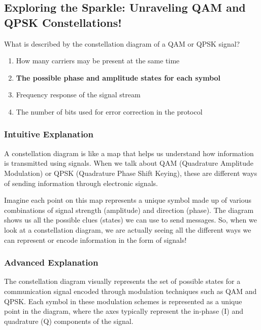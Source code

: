 \subsection{Exploring the Sparkle: Unraveling QAM and QPSK Constellations!}

\begin{tcolorbox}[colback=gray!10, colframe=black, title={\textbf{Question ID: E8C13}}]
What is described by the constellation diagram of a QAM or QPSK signal?
\begin{enumerate}[label=\Alph*.]
    \item How many carriers may be present at the same time
    \item \textbf{The possible phase and amplitude states for each symbol}
    \item Frequency response of the signal stream
    \item The number of bits used for error correction in the protocol
\end{enumerate}
\end{tcolorbox}

\subsubsection{Intuitive Explanation}
A constellation diagram is like a map that helps us understand how information is transmitted using signals. When we talk about QAM (Quadrature Amplitude Modulation) or QPSK (Quadrature Phase Shift Keying), these are different ways of sending information through electronic signals. 

Imagine each point on this map represents a unique symbol made up of various combinations of signal strength (amplitude) and direction (phase). The diagram shows us all the possible clues (states) we can use to send messages. So, when we look at a constellation diagram, we are actually seeing all the different ways we can represent or encode information in the form of signals!

\subsubsection{Advanced Explanation}
The constellation diagram visually represents the set of possible states for a communication signal encoded through modulation techniques such as QAM and QPSK. Each symbol in these modulation schemes is represented as a unique point in the diagram, where the axes typically represent the in-phase (I) and quadrature (Q) components of the signal.

